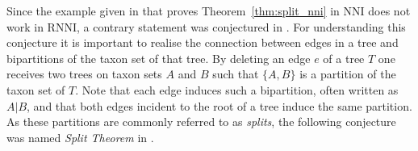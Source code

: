 \documentclass{amsart}
\newcommand{\nni}{\mathrm{NNI}}
\newcommand{\rnni}{\mathrm{RNNI}}
\begin{document}



Since the example given in \autocite{Li1996} that proves Theorem~\ref{thm:split_nni} in $\nni$ does not work in $\rnni$, a contrary statement was conjectured in \autocite{Gavryushkin2017}.
For understanding this conjecture it is important to realise the connection between edges in a tree and bipartitions of the taxon set of that tree.
By deleting an edge $e$ of a tree $T$ one receives two trees on taxon sets $A$ and $B$ such that $\{A,B\}$ is a partition of the taxon set of $T$.
Note that each edge induces such a bipartition, often written as $A|B$, and that both edges incident to the root of a tree induce the same partition.
As these partitions are commonly referred to as \emph{splits}, the following conjecture was named \emph{Split Theorem} in \autocite{Gavryushkin2017}.
\end{document}
